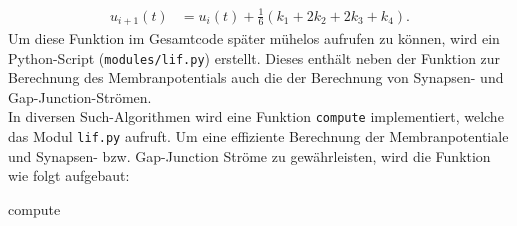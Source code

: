 	\begin{align}
		\label{eq:runkgekutta_erg}
		u_{i+1}(t) &= u_i(t) + \tfrac{1}{6} (k_1 + 2 k_2 + 2 k_3 + k_4).
	\end{align}
	Um diese Funktion im Gesamtcode später mühelos aufrufen zu können, wird ein Python-Script (\texttt{modules/lif.py}) erstellt. Dieses enthält neben der Funktion zur Berechnung des Membranpotentials auch die der Berechnung von Synapsen- und Gap-Junction-Strömen.\\
	In diversen Such-Algorithmen wird eine Funktion \texttt{compute} implementiert, welche das Modul \texttt{lif.py} aufruft. Um eine effiziente Berechnung der Membranpotentiale und Synapsen- bzw. Gap-Junction Ströme zu gewährleisten, wird die Funktion wie folgt aufgebaut:
	\begin{algorithm}
		
		
		\caption{compute}
	\end{algorithm}\\
